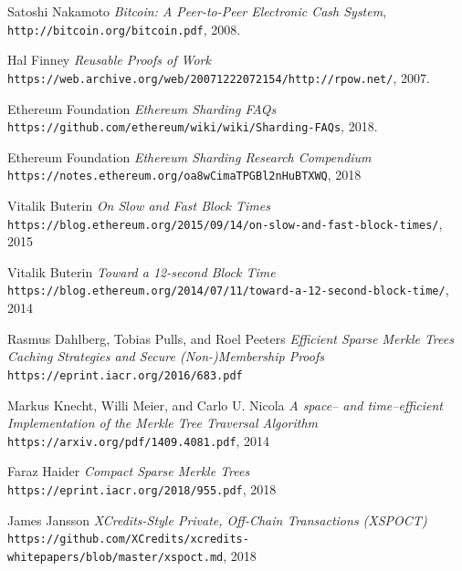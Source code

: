 \documentclass[a4paper,12pt]{article}
\begin{document}
\begin{thebibliography}{9}
    Satoshi Nakamoto
    \textit{Bitcoin: A Peer-to-Peer Electronic Cash System},
    \\\texttt{http://bitcoin.org/bitcoin.pdf}, 2008.

    Hal Finney
    \textit{Reusable Proofs of Work}
    \\\texttt{https://web.archive.org/web/20071222072154/http://rpow.net/}, 2007.
  
    Ethereum Foundation
    \textit{Ethereum Sharding FAQs}
    \\\texttt{https://github.com/ethereum/wiki/wiki/Sharding-FAQs}, 2018.

    Ethereum Foundation
    \textit{Ethereum Sharding Research Compendium}
    \\\texttt{https://notes.ethereum.org/oa8wCimaTPGBl2nHuBTXWQ}, 2018

    Vitalik Buterin
    \textit{On Slow and Fast Block Times}
    \\\texttt{https://blog.ethereum.org/2015/09/14/on-slow-and-fast-block-times/}, 2015

    Vitalik Buterin
    \textit{Toward a 12-second Block Time}
    \\\texttt{https://blog.ethereum.org/2014/07/11/toward-a-12-second-block-time/}, 2014

    Rasmus Dahlberg, Tobias Pulls, and Roel Peeters
    \textit{Efficient Sparse Merkle Trees Caching Strategies and Secure (Non-)Membership Proofs
    }
    \\\texttt{https://eprint.iacr.org/2016/683.pdf}

    Markus Knecht, Willi Meier, and Carlo U. Nicola
    \textit{A space– and time–efficient Implementation of the Merkle Tree
    Traversal Algorithm}
    \\\texttt{https://arxiv.org/pdf/1409.4081.pdf}, 2014

    Faraz Haider
    \textit{Compact Sparse Merkle Trees}
    \\\texttt{https://eprint.iacr.org/2018/955.pdf}, 2018

    James Jansson
    \textit{XCredits-Style Private, Off-Chain Transactions (XSPOCT)}
    \\\texttt{https://github.com/XCredits/xcredits-whitepapers/blob/master/xspoct.md}, 2018

\end{thebibliography}
\end{document}
